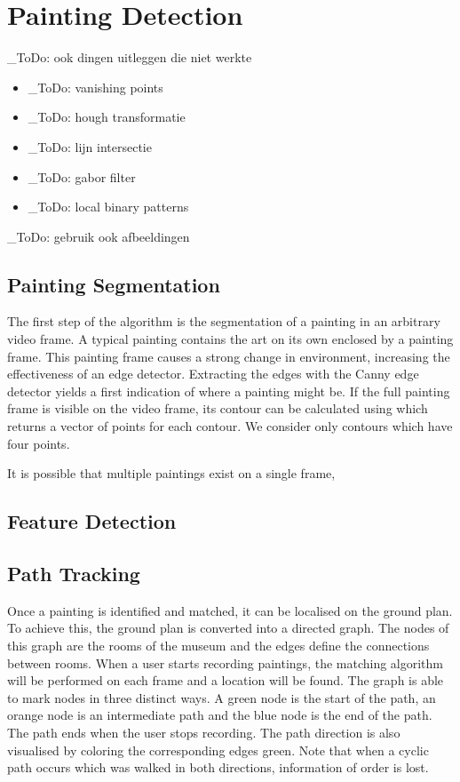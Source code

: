 \documentclass[10pt,final,journal]{IEEEtran}
\newcommand{\todo}[1]{\color{red}\_ToDo: #1 \color{black}}
\begin{document}
	\section{Painting Detection}
	\todo{ook dingen uitleggen die niet werkte}
	\begin{itemize}
		\item \todo{vanishing points}
		\item \todo{hough transformatie}
		\item \todo{lijn intersectie}
		\item \todo{gabor filter}
		\item \todo{local binary patterns}
	\end{itemize}

	\todo{gebruik ook afbeeldingen}
	
	\subsection{Painting Segmentation}
	The first step of the algorithm is the segmentation of a painting in an arbitrary video frame. A typical painting contains the art on its own enclosed by a painting frame. This painting frame causes a strong change in environment, increasing the effectiveness of an edge detector. Extracting the edges with the Canny edge detector yields a first indication of where a painting might be. If the full painting frame is visible on the video frame, its contour can be calculated using \cite{SUZUKI198532} which returns a vector of points for each contour. We consider only contours which have four points.
	
	It is possible that multiple paintings exist on a single frame, 
	
	\subsection{Feature Detection}
	
	
	\subsection{Path Tracking}
	Once a painting is identified and matched, it can be localised on the ground plan. To achieve this, the ground plan is converted into a directed graph. The nodes of this graph are the rooms of the museum and the edges define the connections between rooms. When a user starts recording paintings, the matching algorithm will be performed on each frame and a location will be found. The graph is able to mark nodes in three distinct ways. A green node is the start of the path, an orange node is an intermediate path and the blue node is the end of the path. The path ends when the user stops recording. The path direction is also visualised by coloring the corresponding edges green. Note that when a cyclic path occurs which was walked in both directions, information of order is lost.
	
\end{document}
